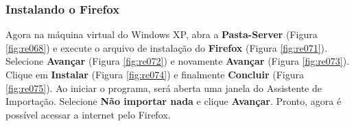 \documentclass[10pt]{article}
\begin{document}
\subsubsection{Instalando o Firefox}

\par Agora na máquina virtual do Windows XP, abra a \textbf{Pasta-Server} (Figura \ref{fig:re068}) e execute o arquivo de instalação do \textbf{Firefox} (Figura \ref{fig:re071}). Selecione \textbf{Avançar} (Figura \ref{fig:re072}) e novamente \textbf{Avançar} (Figura \ref{fig:re073}). Clique em \textbf{Instalar} (Figura \ref{fig:re074}) e finalmente \textbf{Concluir} (Figura \ref{fig:re075}). Ao iniciar o programa, será aberta uma janela do Assistente de Importação. Selecione \textbf{Não importar nada} e clique \textbf{Avançar}. Pronto, agora é possível acessar a internet pelo Firefox. 
\end{document}
